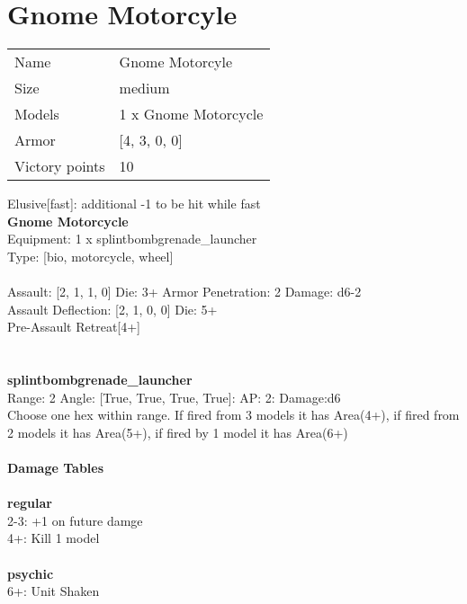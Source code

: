 \pagebreak

\section{ Gnome Motorcyle }

\begin{tabular}{ll}
  Name & Gnome Motorcyle \\
  Size & medium\\
  Models & 1 x Gnome Motorcycle\\
  Armor & [4, 3, 0, 0]\\
  Victory points & 10\\
\end{tabular}

Elusive[fast]: additional -1 to be hit while fast\\ 


{\bf Gnome Motorcycle } \\
Equipment: 1 x splintbombgrenade_launcher \\
Type: [bio, motorcycle, wheel] \\
\ \\
Assault: [2, 1, 1, 0] Die: 3+ Armor Penetration: 2 Damage: d6-2 \\
Assault Deflection: [2, 1, 0, 0] Die: 5+\\
\indent Pre-Assault Retreat[4+]\\ 
 
\ \\

\ \\
{\bf splintbombgrenade_launcher } \\



Range: 2  Angle: [True, True, True, True]: AP: 2: Damage:d6 \\
Choose one hex within range. If fired from 3 models it has Area(4+), if fired from 2 models it has Area(5+), if fired by 1 model it has Area(6+)\\ 




 
\ \\




{\bf Damage Tables} \\
\ \\ {\bf regular } \\
2-3: +1 on future damge \\
4+: Kill 1 model \\
\ \\ {\bf psychic } \\
6+: Unit Shaken \\










